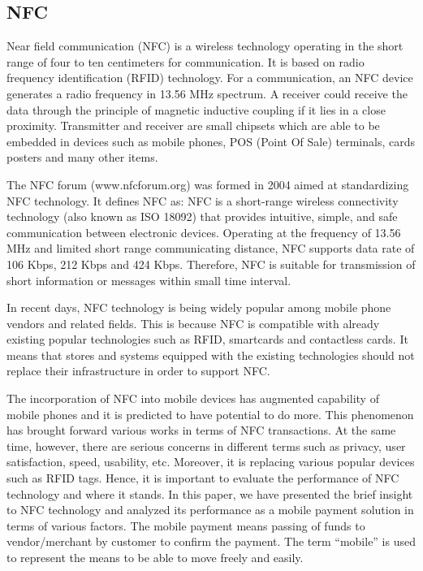 \documentclass[journal]{IEEEtran}
\begin{document}
\subsection{NFC}
Near field communication (NFC) is a wireless technology operating in the short range of four to ten centimeters for communication. It is based on radio frequency identification (RFID) technology. For a communication, an NFC device generates a radio frequency in 13.56 MHz spectrum. A receiver could receive the data through the principle of magnetic inductive coupling if it lies in a close proximity. Transmitter and receiver are small chipsets which are able to be embedded in devices such as mobile phones, POS (Point Of Sale) terminals, cards posters and many other items. 

The NFC forum (www.nfcforum.org) was formed in 2004 aimed at standardizing NFC technology. It defines NFC as: NFC is a short-range wireless connectivity technology (also known as ISO 18092) that provides intuitive, simple, and safe communication between electronic devices. Operating at the frequency of 13.56 MHz and limited short range communicating distance, NFC supports data rate of 106 Kbps, 212 Kbps and 424 Kbps. Therefore, NFC is suitable for transmission of short information or messages within small time interval. 

In recent days, NFC technology is being widely popular among mobile phone vendors and related fields. This is because NFC is compatible with already existing popular technologies such as RFID, smartcards and contactless cards. It means that stores and systems equipped with the existing technologies should not replace their infrastructure in order to support NFC. 

The incorporation of NFC into mobile devices has augmented capability of mobile phones and it is predicted to have potential to do more. This phenomenon has brought forward various works in terms of NFC transactions. At the same time, however, there are serious concerns in different terms such as privacy, user satisfaction, speed, usability, etc. Moreover, it is replacing various popular devices such as RFID tags. Hence, it is important to evaluate the performance of NFC technology and where it stands. In this paper, we have presented the brief insight to NFC technology and analyzed its performance as a mobile payment solution in terms of various factors. The mobile payment means passing of funds to vendor/merchant by customer to confirm the payment. The term “mobile” is used to represent the means to be able to move freely and easily.
\end{document}
